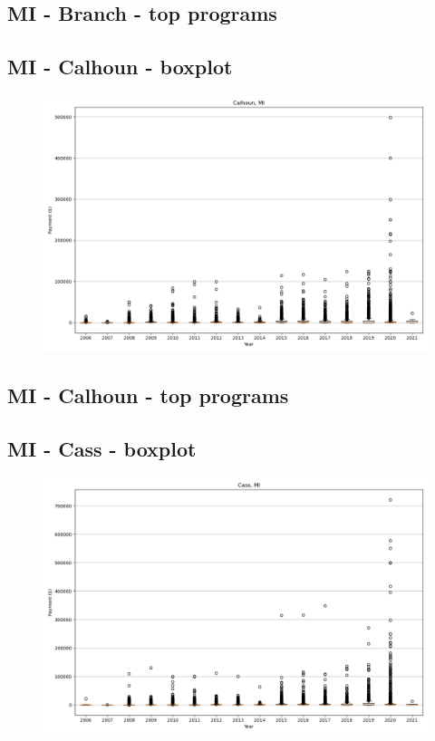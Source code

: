 \subsection*{MI - Branch - top programs}

\newpage
\subsection*{MI - Calhoun - boxplot}
\begin{figure}[h]
\centering
\includegraphics[width=7in]{../output/boxplots/counties/Calhoun-MI_boxplot.png}
\end{figure}


\subsection*{MI - Calhoun - top programs}

\newpage
\subsection*{MI - Cass - boxplot}
\begin{figure}[h]
\centering
\includegraphics[width=7in]{../output/boxplots/counties/Cass-MI_boxplot.png}
\end{figure}


